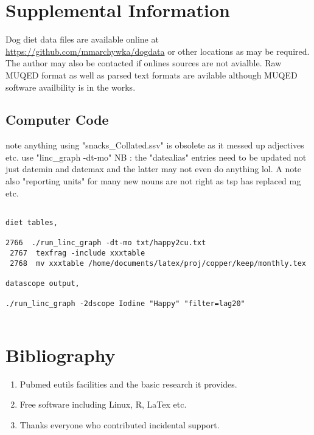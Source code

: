 \section{Supplemental Information}

Dog diet data files are available online at
{\url{https://github.com/mmarchywka/dogdata}}
or other locations as may be required.
The author may also be contacted if onlines sources are not
avialble. Raw MUQED format as well as parsed text formats
are avilable although MUQED software availbility is in the works.


\subsection{Computer Code}
note anything using "snacks\_Collated.ssv" is obsolete as it messed
up adjectives etc. use "linc\_graph -dt-mo"
NB : the "datealias" entries need to be updated not just datemin and datemax
and the latter may not even do anything lol.  A note also
"reporting units" for many new nouns are not right as tsp
 has replaced mg etc. 

\begin{lstlisting}

diet tables, 

2766  ./run_linc_graph -dt-mo txt/happy2cu.txt 
 2767  texfrag -include xxxtable 
 2768  mv xxxtable /home/documents/latex/proj/copper/keep/monthly.tex

datascope output, 

./run_linc_graph -2dscope Iodine "Happy" "filter=lag20"


\end{lstlisting}
\section{Bibliography}






\begin{acknowledgments} 

% 
\begin{enumerate}
\item Pubmed eutils facilities and the basic research it provides. 
\item Free software including Linux, R, LaTex  etc.
\item Thanks everyone who contributed incidental support. 
\end{enumerate}

\end{acknowledgments}

